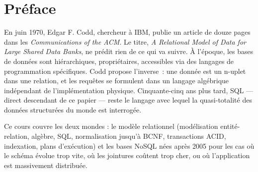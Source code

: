 \documentclass[12pt,a4paper,twoside]{book}
\theoremstyle{definition}
\theoremstyle{plain}
\theoremstyle{remark}
\begin{document}
\begin{titlepage}
\end{titlepage}

\frontmatter
\tableofcontents


\chapter*{Pr\'eface}

En juin 1970, Edgar F. Codd, chercheur \`a IBM, publie un article de douze pages dans les \emph{Communications of the ACM}. Le titre, \emph{A Relational Model of Data for Large Shared Data Banks}, ne pr\'edit rien de ce qui va suivre. \`A l'\'epoque, les bases de donn\'ees sont hi\'erarchiques, propri\'etaires, accessibles via des langages de programmation sp\'ecifiques. Codd propose l'inverse~: une donn\'ee est un n-uplet dans une relation, et les requ\^etes se formulent dans un langage alg\'ebrique ind\'ependant de l'impl\'ementation physique. Cinquante-cinq ans plus tard, SQL --- direct descendant de ce papier --- reste le langage avec lequel la quasi-totalit\'e des donn\'ees structur\'ees du monde est interrog\'ee.

\medskip

Ce cours couvre les deux mondes : le mod\`ele relationnel (mod\'elisation entit\'e-relation, alg\`ebre, SQL, normalisation jusqu'\`a BCNF, transactions ACID, indexation, plans d'ex\'ecution) et les bases NoSQL n\'ees apr\`es 2005 pour les cas o\`u le sch\'ema \'evolue trop vite, o\`u les jointures co\^utent trop cher, ou o\`u l'application est massivement distribu\'ee.
\end{document}
